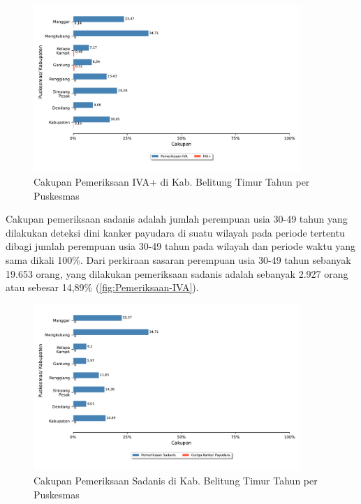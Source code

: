 \begin{figure}[H]
  \centering
  \includegraphics[width=0.9\textwidth]{bab_06/bab_06_15a_IVA}
  \caption{Cakupan Pemeriksaan IVA+ di Kab. Belitung Timur Tahun \tP per Puskesmas}
  \label{fig:Pemeriksaan-IVA}
\end{figure}

Cakupan pemeriksaan sadanis adalah jumlah perempuan usia 30-49 tahun yang dilakukan deteksi dini kanker payudara di suatu wilayah pada periode tertentu dibagi jumlah perempuan usia 30-49 tahun pada wilayah dan periode waktu yang sama dikali 100\%.
Dari perkiraan sasaran perempuan usia 30-49 tahun sebanyak 19.653 orang, yang dilakukan pemeriksaan sadanis adalah sebanyak 2.927 orang atau sebesar 14,89\% (\autoref{fig:Pemeriksaan-IVA}).

\begin{figure}[H]
	\centering
	\includegraphics[width=0.9\textwidth]{bab_06/bab_06_15b_sadanis}
	\caption{Cakupan Pemeriksaan Sadanis di Kab. Belitung Timur Tahun \tP per Puskesmas}
	\label{fig:Pemeriksaan-Sadanis}
\end{figure}

